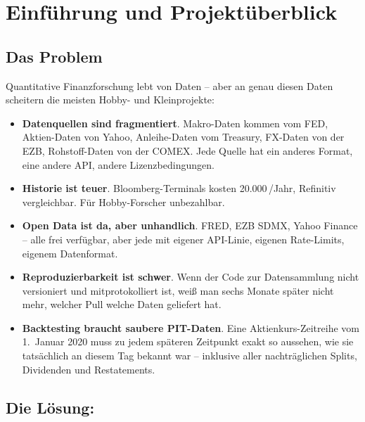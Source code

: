 
\chapter{Einführung und Projektüberblick}

\label{ch:einfuehrung}

\section{Das Problem}

Quantitative Finanzforschung lebt von Daten -- aber an genau diesen
Daten scheitern die meisten Hobby- und Kleinprojekte:

\begin{itemize}
  \item \textbf{Datenquellen sind fragmentiert}. Makro-Daten kommen vom
        FED, Aktien-Daten von Yahoo, Anleihe-Daten vom Treasury, FX-Daten
        von der EZB, Rohstoff-Daten von der COMEX. Jede Quelle hat ein
        anderes Format, eine andere API, andere Lizenzbedingungen.
  \item \textbf{Historie ist teuer}. Bloomberg-Terminals kosten
        20.000\,{}/Jahr, Refinitiv vergleichbar. Für
        Hobby-Forscher unbezahlbar.
  \item \textbf{Open Data ist da, aber unhandlich}. FRED, EZB SDMX,
        Yahoo Finance -- alle frei verfügbar, aber jede mit eigener
        API-Linie, eigenen Rate-Limits, eigenem Datenformat.
  \item \textbf{Reproduzierbarkeit ist schwer}. Wenn der Code zur
        Datensammlung nicht versioniert und mitprotokolliert ist,
        weiß man sechs Monate später nicht mehr, welcher Pull
        welche Daten geliefert hat.
  \item \textbf{Backtesting braucht saubere PIT-Daten}. Eine
        Aktienkurs-Zeitreihe vom 1.~Januar 2020 muss zu jedem
        späteren Zeitpunkt exakt so aussehen, wie sie tatsächlich
        an diesem Tag bekannt war -- inklusive aller nachträglichen
        Splits, Dividenden und Restatements.
\end{itemize}

\section{Die Lösung: }

